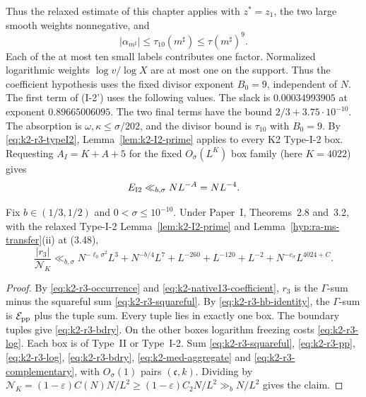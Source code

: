 Thus the relaxed estimate of this chapter applies with
\(z^*=z_1\), the two large smooth weights nonnegative, and
\[
 |\alpha_{m^\sharp}|\le\tau_{10}(m^\sharp)\le\tau(m^\sharp)^9.
\]
Each of the at most ten small labels contributes one factor. Normalized
logarithmic weights \(\log v/\log X\) are at most one on the support.
Thus the coefficient hypothesis uses the fixed divisor exponent
\(B_0=9\), independent of \(N\). The first term of (I-2') uses the
following values. The slack is \(0.00034993905\)
at exponent \(0.89665006095\). The two final terms have the bound
\(2/3+3.75\cdot10^{-10}\). The absorption is
\(\omega,\kappa\le\sigma/202\), and the divisor bound is \(\tau_{10}\)
with \(B_0=9\). By \eqref{eq:k2-r3-typeI2}, Lemma~\ref{lem:k2-I2-prime}
applies to every K2 Type-I-2 box. Requesting \(A_I=K+A+5\) for the
fixed \(O_\sigma(L^K)\) box family (here \(K=4022\)) gives
\begin{equation}\label{eq:k2-r3-complementary}
 E_{\rm I2}\ll_{b,\sigma}NL^{-A}=NL^{-4}.
\end{equation}

\begin{proposition}\label{prop:k2-row3}
Fix \(b\in(1/3,1/2)\) and \(0<\sigma\le10^{-10}\). Under Paper~I,
Theorems~2.8 and~3.2, with the relaxed Type-I-2
Lemma~\ref{lem:k2-I2-prime} and Lemma~\ref{hyp:ra-ms-transfer}(ii) at (3.48),
\[
 \frac{|r_3|}{\mathcal N_K}\ll_{b,\sigma}
 N^{-\ell_0\sigma^2}L^3+N^{-b/4}L^7+L^{-260}+L^{-120}+L^{-2}
 +N^{-c_\sigma}L^{4024+C}.
\]
\end{proposition}

\begin{proof}
By \eqref{eq:k2-r3-occurrence} and \eqref{eq:k2-native13-coefficient},
\(r_3\) is the \(\Gamma\)-sum minus the squareful sum
\eqref{eq:k2-r3-squareful}. By \eqref{eq:k2-r3-hb-identity}, the
\(\Gamma\)-sum is \(\mathcal E_{\rm pp}\) plus the tuple sum. Every tuple
lies in exactly one box. The boundary tuples give
\eqref{eq:k2-r3-bdry}. On the other boxes logarithm freezing costs
\eqref{eq:k2-r3-log}. Each box is of Type~II or Type~I-2. Sum
\eqref{eq:k2-r3-squareful}, \eqref{eq:k2-r3-pp}, \eqref{eq:k2-r3-log},
\eqref{eq:k2-r3-bdry}, \eqref{eq:k2-med-aggregate} and
\eqref{eq:k2-r3-complementary}, with \(O_\sigma(1)\) pairs
\((\mathfrak c,k)\). Dividing by
\(\mathcal N_K=(1-\varepsilon)C(N)N/L^2\ge(1-\varepsilon)C_2N/L^2\gg_b N/L^2\) gives the
claim.
\end{proof}

